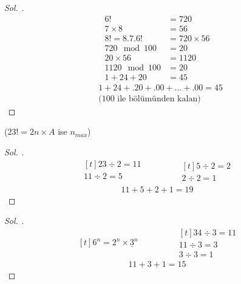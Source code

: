 \documentclass{article}
\theoremstyle{mytheoremstyle}
\theoremstyle{mytheoremstyle}
\theoremstyle{myproblemstyle}
\begin{document}
\begin{problem}
\end{problem}

\begin{proof}[\textit{ Sol. }]
  \begin{align*}
    6! &= 720\\
    7 \times 8 &= 56\\
    8! = 8.7.6! &= 720 \times 56\\
    720 \mod 100 &= 20\\
    20 \times 56 &= 1120\\
    1120 \mod 100 &= 20\\
    1 + 24 + 20 &= 45
  \end{align*}
  \begin{align*}
    &1 + 24 + .20 + .00 + ... + .00 = 45\\
    &\text{(100 ile bölümünden kalan)}
  \end{align*}
\end{proof}

\begin{problem}
  ($ 23! = 2n \times A $ ise $ n_{max} $)
\end{problem}

\begin{proof}[\textit{ Sol. }]
  \begin{equation*}
    \begin{aligned}[t]
      23 \div 2 = 11\\
      11 \div 2 = 5\\
    \end{aligned}
    \qquad\qquad
    \begin{aligned}[t]
      5 \div 2 = 2\\
      2 \div 2 = 1
    \end{aligned}
  \end{equation*}
  \begin{align*}
    11 + 5 + 2 + 1 = 19
  \end{align*}
\end{proof}

\begin{problem}[$ 34! = 6^n \times A $, $ n_{max} = ? $]
\end{problem}

\begin{proof}[\textit{ Sol. }]
  \begin{equation*}
    \begin{aligned}[t]
      6^n = 2^n \times \underline 3^n
    \end{aligned}
    \qquad\qquad
    \begin{aligned}[t]
      34 \div 3 = 11\\
      11 \div 3 = 3\\
      3 \div 3 = 1
    \end{aligned}
  \end{equation*}
  \begin{align*}
    11 + 3 + 1 = 15
  \end{align*}
\end{proof}
\end{document}
